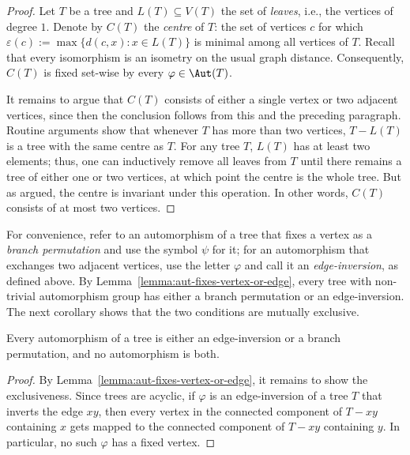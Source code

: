 \begin{proof}
    Let $T$ be a tree and $L(T)\subseteq V(T)$ the set of \emph{leaves}, i.e., the vertices of degree $1$.
    Denote by $C(T)$ the \emph{centre} of $T$: the set of vertices $c$ for which $\varepsilon(c):=\max\{d(c,x):x\in L(T)\}$ is minimal among all vertices of $T$.
    Recall that every isomorphism is an isometry on the usual graph distance.
    Consequently, $C(T)$ is fixed set-wise by every $\varphi\in\Aut(T)$.

    It remains to argue that $C(T)$ consists of either a single vertex or two adjacent vertices, since then the conclusion follows from this and the preceding paragraph.
    Routine arguments show that whenever $T$ has more than two vertices, $T-L(T)$ is a tree with the same centre as $T$.
    For any tree $T$, $L(T)$ has at least two elements; thus, one can inductively remove all leaves from $T$ until there remains a tree of either one or two vertices, at which point the centre is the whole tree.
    But as argued, the centre is invariant under this operation.
    In other words, $C(T)$ consists of at most two vertices.
\end{proof}

For convenience, refer to an automorphism of a tree that fixes a vertex as a \emph{branch permutation} and use the symbol $\psi$ for it; for an automorphism that exchanges two adjacent vertices, use the letter $\varphi$ and call it an \emph{edge-inversion}, as defined above.
By Lemma~\ref{lemma:aut-fixes-vertex-or-edge}, every tree with non-trivial automorphism group has either a branch permutation or an edge-inversion.
The next corollary shows that the two conditions are mutually exclusive.

\begin{corollary}\label{cor:aut-tree-dichotomy}
    Every automorphism of a tree is either an edge-inversion or a branch permutation, and no automorphism is both.
\end{corollary}

\begin{proof}
    By Lemma~\ref{lemma:aut-fixes-vertex-or-edge}, it remains to show the exclusiveness.
    Since trees are acyclic, if $\varphi$ is an edge-inversion of a tree $T$ that inverts the edge $xy$, then every vertex in the connected component of $T-xy$ containing $x$ gets mapped to the connected component of $T-xy$ containing $y$.
    In particular, no such $\varphi$ has a fixed vertex.
\end{proof}

